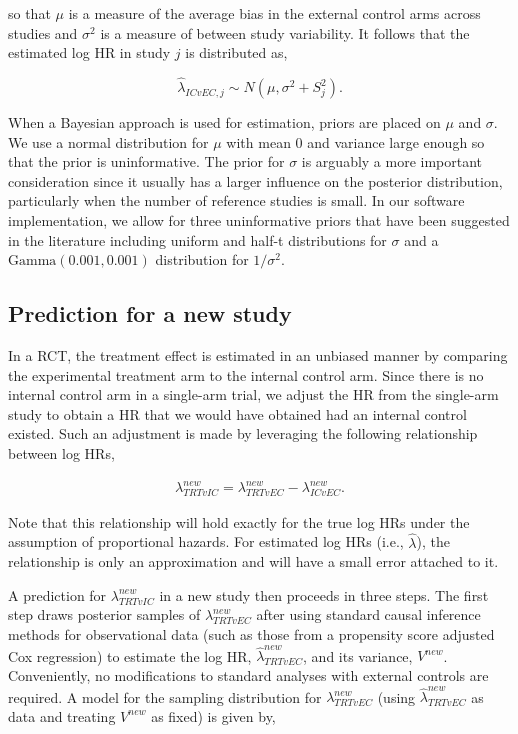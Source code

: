 \documentclass[11pt,final,fleqn]{article}\usepackage[]{graphicx}\usepackage[]{color}
\begin{document}
so that $\mu$ is a measure of the average bias in the external control arms across studies and $\sigma^2$ is a measure of between study variability. It follows that the estimated log HR in study $j$ is distributed as,

\begin{equation}
\hat\lambda_{ICvEC,j} \sim N ( \mu , \sigma^2 + S_j^2).
\end{equation}

When a Bayesian approach is used for estimation, priors are placed on $\mu$ and $\sigma$. We use a normal distribution for $\mu$ with mean $0$ and variance large enough so that the prior is uninformative. The prior for $\sigma$ is arguably a more important consideration since it usually has a larger influence on the posterior distribution, particularly when the number of reference studies is small. In our software implementation, we allow for three uninformative priors that have been suggested in the literature including uniform \cite{gelman2013bayesian} and half-t \cite{gelman2006prior, polson2012half} distributions for $\sigma$ and a $\text{Gamma}(0.001, 0.001)$ distribution \cite{spiegelhalter2004bayesian} for $1/\sigma^2$.


\subsection{Prediction for a new study} \label{subsec:prediction}
In a RCT, the treatment effect is estimated in an unbiased manner by comparing the experimental treatment arm to the internal control arm. Since there is no internal control arm in a single-arm trial, we adjust the HR from the single-arm study to obtain a HR that we would have obtained had an internal control existed. Such an adjustment is made by leveraging the following relationship between log HRs,


\begin{align} \label{eqn:hr-relationship}
\lambda_{TRTvIC}^{new} = \lambda_{TRTvEC}^{new} - \lambda_{ICvEC}^{new}.
\end{align}

Note that this relationship will hold exactly for the true log HRs under the assumption of proportional hazards. For estimated log HRs (i.e., $\hat{\lambda}$), the relationship is only an approximation and will have a small error attached to it. 

A prediction for $\lambda_{TRTvIC}^{new} $ in a new study then proceeds in three steps. The first step draws posterior samples of $ \lambda_{TRTvEC}^{new}$ after using standard causal inference methods for observational data (such as those from a propensity score adjusted Cox regression) to estimate the log HR, $\hat{\lambda}_{TRTvEC}^{new}$, and its variance, $V^{new}$. Conveniently, no modifications to standard analyses with external controls are required.  A model for the sampling distribution for $\lambda_{TRTvEC}^{new}$ (using $\hat{\lambda}_{TRTvEC}^{new}$ as data and treating $V^{new}$ as fixed)  is given by,
\end{document}
